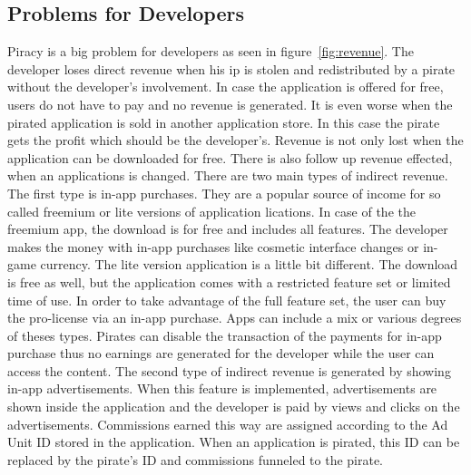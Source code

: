\subsection{Problems for Developers} \label{subsection:foundation-piracy-developers}
Piracy is a big problem for developers as seen in figure~\ref{fig:revenue}.
The developer loses direct revenue when his \gls{ip} is stolen and redistributed by a pirate without the developer's involvement.
In case the application is offered for free, users do not have to pay and no revenue is generated.
It is even worse when the pirated application is sold in another application store.
In this case the pirate gets the profit which should be the developer's.
\newline
Revenue is not only lost when the application can be downloaded for free.
There is also follow up revenue effected, when an applications is changed.
There are two main types of indirect revenue.
\newline
The first type is in-app purchases.
They are a popular source of income for so called freemium or lite versions of  application lications.
In case of the the freemium app, the download is for free and includes all features.
The developer makes the money with in-app purchases like cosmetic interface changes or in-game currency.
The lite version application is a little bit different.
The download is free as well, but the application comes with a restricted feature set or limited time of use.
In order to take advantage of the full feature set, the user can buy the pro-license via an in-app purchase.
\newline
Apps can include a mix or various degrees of theses types.
Pirates can disable the transaction of the payments for in-app purchase thus no earnings are generated for the developer while the user can access the content.
\newline
The second type of indirect revenue is generated by showing in-app advertisements.
When this feature is implemented, advertisements are shown inside the application and the developer is paid by views and clicks on the advertisements.
Commissions earned this way are assigned according to the Ad Unit ID \cite{googleAdmob} stored in the application.
When an application is pirated, this ID can be replaced by the pirate's ID and commissions funneled to the pirate.
\newline
